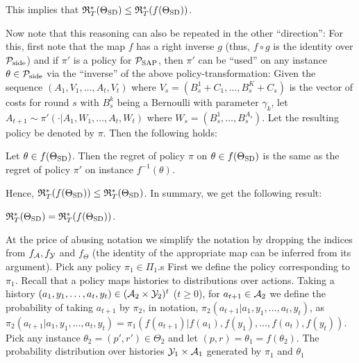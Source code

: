 This implies that $\mathfrak{R}_T^*(\Theta_{\mathrm{SD}})\le \mathfrak{R}_T^*(f(\Theta_{\mathrm{SD}}))$.

Now note that this reasoning can also be repeated in the other ``direction'': 
For this, first note that the map $f$ has a right inverse $g$ 
(thus, $f\circ g$ is the identity over $\mathcal{P}_{\mathrm{side}}$)
and if $\pi'$ is a policy for $\mathcal{P}_{\mathrm{SAP}}$, 
then $\pi'$ can be ``used''  on any instance $\theta\in \mathcal{P}_{\mathrm{side}}$
via the ``inverse'' of the above policy-transformation:
Given the sequence $(A_1,V_1,\dots,A_t,V_t)$ where 
$V_s= (B_s^1+C_1,\dots,B_ s^{K}+C_s)$ is the vector of costs for round $s$
with $B_s^k$ being a Bernoulli with parameter $\gamma_k$,
let $A_{t+1} \sim \pi'( \cdot| A_1,W_1,\dots,A_t,W_t)$ where
$W_s = (B_s^1,\dots,B_s^{A_s})$. Let the resulting policy be denoted by $\pi$.
Then the following holds:
\begin{prop}
Let $\theta \in f(\Theta_{\mathrm{SD}})$. Then the regret of policy $\pi$ on $\theta\in f(\Theta_{\mathrm{SD}})$ is the same
as the regret of policy $\pi'$ on instance $f^{-1}(\theta)$.
\end{prop}
Hence, $\mathfrak{R}_T^*(f(\Theta_{\mathrm{SD}}))\le \mathfrak{R}_T^*(\Theta_{\mathrm{SD}})$.
In summary, we get the following result:
\begin{cor}
$\mathfrak{R}_T^*(\Theta_{\mathrm{SD}}) = \mathfrak{R}_T^*(f(\Theta_{\mathrm{SD}}))$. 
\end{cor}

At the price of abusing notation 
we simplify the notation by dropping the indices from $f_{\mathcal{A}}, f_{\mathcal{Y}}$ and $f_{\Theta}$ (the identity of the appropriate map can be inferred from its argument).
Pick any policy $\pi_1\in \Pi_1$.s
First we define the policy corresponding to $\pi_1$.
Recall that a policy maps histories to distributions over actions.
Taking a history $(a_1,y_1,\dots,a_t,y_t)\in (\mathcal{A}_2\times \mathcal{Y}_2)^t$ ($t\ge 0$),
for $a_{t+1}\in \mathcal{A}_2$ we define the probability of taking $a_{t+1}$ by $\pi_2$, in notation,
 $\pi_2(a_{t+1}|a_1,y_1,\dots,a_t,y_t)$, as
 $\pi_2(a_{t+1}|a_1,y_1,\dots,a_t,y_t) = \pi_1(f(a_{t+1})|f(a_1),f(y_1),\dots,f(a_t),f(y_t))$.
Pick any instance $\theta_2 = (p',r')\in \Theta_2$ and let $(p,r) = \theta_1  = f( \theta_2)$.
The probability distribution over histories $\mathcal{Y}_1 \times \mathcal{A}_1$ generated by $\pi_1$ and $\theta_1$
\fi



